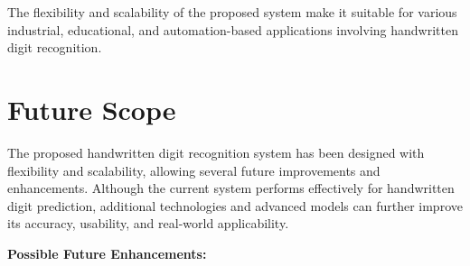 \documentclass[12pt,a4paper]{article}
\begin{document}
\vspace{0.3cm}

\noindent
The flexibility and scalability of the proposed system make it suitable for various industrial, educational, and automation-based applications involving handwritten digit recognition.

\newpage

\section{Future Scope}

\vspace{0.3cm}

\noindent
The proposed handwritten digit recognition system has been designed with flexibility and scalability, allowing several future improvements and enhancements. Although the current system performs effectively for handwritten digit prediction, additional technologies and advanced models can further improve its accuracy, usability, and real-world applicability.

\vspace{0.4cm}

\noindent
\textbf{Possible Future Enhancements:}
\end{document}
